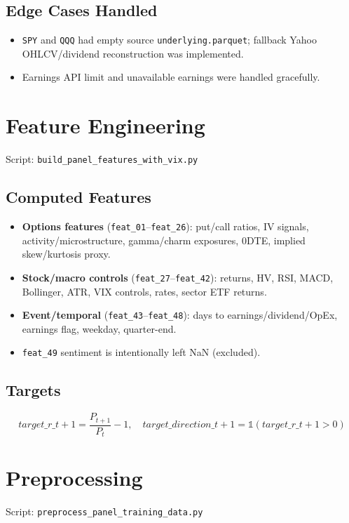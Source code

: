 \documentclass[11pt]{article}
\begin{document}
\subsection{Edge Cases Handled}
\begin{itemize}[leftmargin=1.2em]
  \item \texttt{SPY} and \texttt{QQQ} had empty source \texttt{underlying.parquet}; fallback Yahoo OHLCV/dividend reconstruction was implemented.
  \item Earnings API limit and unavailable earnings were handled gracefully.
\end{itemize}

\section{Feature Engineering}
Script: \texttt{build\_panel\_features\_with\_vix.py}

\subsection{Computed Features}
\begin{itemize}[leftmargin=1.2em]
  \item \textbf{Options features} (\texttt{feat\_01}--\texttt{feat\_26}): put/call ratios, IV signals, activity/microstructure, gamma/charm exposures, 0DTE, implied skew/kurtosis proxy.
  \item \textbf{Stock/macro controls} (\texttt{feat\_27}--\texttt{feat\_42}): returns, HV, RSI, MACD, Bollinger, ATR, VIX controls, rates, sector ETF returns.
  \item \textbf{Event/temporal} (\texttt{feat\_43}--\texttt{feat\_48}): days to earnings/dividend/OpEx, earnings flag, weekday, quarter-end.
  \item \texttt{feat\_49} sentiment is intentionally left NaN (excluded).
\end{itemize}

\subsection{Targets}
\[
target\_r\_{t+1}=\frac{P_{t+1}}{P_t}-1,\quad
target\_direction\_{t+1}=\mathbb{1}(target\_r\_{t+1}>0)
\]

\section{Preprocessing}
Script: \texttt{preprocess\_panel\_training\_data.py}
\end{document}

